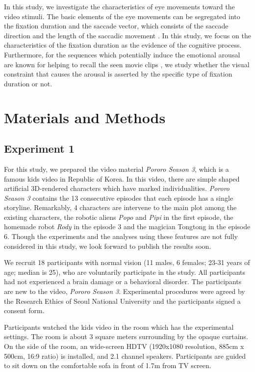 \documentclass[10pt,letterpaper]{article}
\begin{document}
In this study, we investigate the characteristics of eye movements toward the video stimuli. The basic elements of the eye movements can be segregated into the fixation duration and the saccade vector, which consists of the saccade direction and the length of the saccadic movement \cite{Findlay1999,Feng2006}. In this study, we focus on the characteristics of the fixation duration as the evidence of the cognitive process. Furthermore, for the sequences which potentially induce the emotional arousal are known for helping to recall the seen movie clips \cite{Cahill1996amyg,Cahill1998baso}, we study whether the visual constraint that causes the arousal is asserted by the specific type of fixation duration or not.

\section{Materials and Methods}
\label{sec:material-and-methods}

\subsection{Experiment 1}

For this study, we prepared the video material \textit{Pororo Season 3}, which is a famous kids video in Republic of Korea. In this video, there are simple shaped artificial 3D-rendered characters which have marked individualities. \textit{Pororo Season 3} contains the 13 consecutive episodes that each episode has a single storyline. Remarkably, 4 characters are intervene to the main plot among the existing characters, the robotic aliens \textit{Popo} and \textit{Pipi} in the first episode, the homemade robot \textit{Rody} in the episode 3 and the magician Tongtong in the episode 6. Though the experiments and the analyses using these features are not fully considered in this study, we look forward to publish the results soon. 

We recruit 18 participants with normal vision (11 males, 6 females; 23-31 years of age; median is 25), who are voluntarily participate in the study. All participants had not experienced a brain damage or a behavioral disorder. The participants are new to the video, \textit{Pororo Season 3}. Experimental procedures were agreed by the Research Ethics of Seoul National University and the participants signed a consent form.

Participants watched the kids video in the room which has the experimental settings. The room is about 3 square meters surrounding by the opaque curtains. On the side of the room, an wide-screen HDTV (1920x1080 resolution, 885cm x 500cm, 16:9 ratio) is installed, and 2.1 channel speakers. Participants are guided to sit down on the comfortable sofa in front of 1.7m from TV screen.
\end{document}
